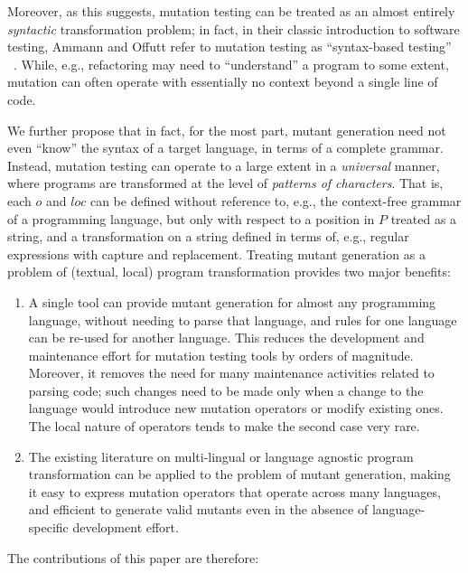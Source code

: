 \documentclass[sigconf,review, anonymous]{acmart}
\begin{document}
Moreover, as this suggests,
mutation testing can be treated as an almost entirely \emph{syntactic}
transformation problem; in fact, in their classic introduction to
software testing, Ammann and Offutt refer to mutation testing as
``syntax-based testing'' ~\cite{ammann2016introduction}.  While, e.g., refactoring may need to
``understand'' a program to some extent, mutation can often operate
with essentially no context beyond a single line of code.

We further propose that in fact, for the most part, mutant
generation need not even ``know'' the syntax of a target language, in
terms of a complete grammar.  Instead, mutation testing can operate to
a large extent in a \emph{universal} manner, where programs are
transformed at the level of \emph{patterns of characters}.  That is,
each $o$ and $loc$ can be defined without reference to, e.g., the
context-free grammar of a programming language, but only with respect
to a position in $P$ treated as a string, and a transformation on a
string defined in terms of, e.g., regular expressions with capture and
replacement.  Treating mutant generation as a problem of (textual, local)
program transformation provides two major benefits:

\begin{enumerate}
  \item A single tool can provide mutant generation for almost any
    programming language, without needing to parse that language, and
    rules for one language can be re-used for another language.  This
    reduces the development and maintenance effort for mutation
    testing tools by orders of magnitude.  Moreover, it removes the
    need for many   maintenance activities related to parsing code;
    such changes need to be made only when a change to the language
    would introduce new mutation operators or modify existing ones.
    The local nature of operators tends to make the second case very rare.
    \item The existing literature on multi-lingual or language
      agnostic program transformation can be applied to the problem of
      mutant generation, making it easy to express mutation operators
      that operate across many languages, and efficient to generate
      valid mutants even in the absence of language-specific
      development effort.
      \end{enumerate}

The contributions of this paper are therefore:
\end{document}

